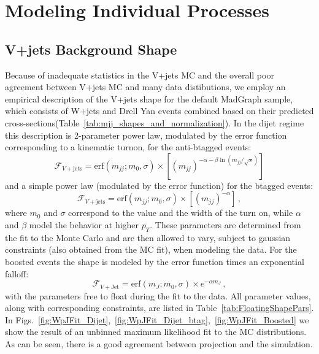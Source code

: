 \clearpage
\section{Modeling Individual Processes}
\label{sec:individualProcesses}
\subsection{V+jets Background Shape}
\label{sec:wjetsShape}

Because of inadequate statistics in the V+jets MC and the overall poor
agreement between V+jets MC and many data distibutions, we employ an
empirical description of the V+jets shape for the default MadGraph sample, which consists of W+jets and Drell Yan events combined based on their predicted cross-sections(Table~\ref{tab:mjj_shapes_and_normalization}). In the dijet regime this description is 2-parameter power law, modulated by the error function corresponding to a kinematic turnon, for the anti-btagged events:
\begin{equation}
  \mathcal{F}_{V+\text{jets}} = \text{erf}(m_{jj}; m_0, \sigma)\times\left[(m_{jj})^{-\alpha-\beta\ln(m_{jj}/\sqrt{s})}\right]
\end{equation}
and a simple power law (modulated by the error function) for the btagged events:
\begin{equation}
  \mathcal{F}_{V+\text{jets}} = \text{erf}(m_{jj}; m_0, \sigma)\times\left[(m_{jj})^{-\alpha}\right]\,,
\end{equation}
where $m_0$ and $\sigma$ correspond to the value and the width of the turn on, while $\alpha$ and $\beta$ model the behavior at higher $p_T$. These parameters are determined from the fit to the Monte Carlo and are then allowed to vary, subject to gaussian constraints (also obtained from the MC fit), when modeling the data. For the boosted events the shape is modeled by the error function times an exponential falloff:
\begin{equation}
  \mathcal{F}_{V+\text{Jet}} = \text{erf}(m_{J}; m_0, \sigma)\times e^{-\alpha m_{J}}\,,
\end{equation}
with the parameters free to float during the fit to the data. All parameter values, along with corresponding constraints, are listed in Table~\ref{tab:FloatingShapePars}. In Figs.~\ref{fig:WpJFit_Dijet},~\ref{fig:WpJFit_Dijet_btag},~\ref{fig:WpJFit_Boosted} we show the result of an unbinned maximum likelihood fit to the MC distributions. As can be seen, there is a good agreement between projection and the simulation.


